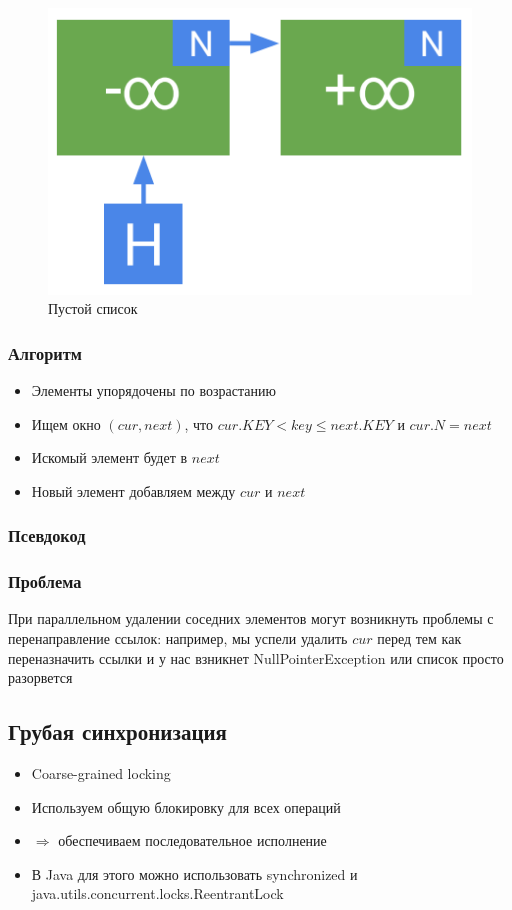 \documentclass[10pt,a4paper,oneside,titlepage]{article}
\theoremstyle{plain}
\theoremstyle{defenition}
\begin{document}
\begin{figure}
	\centering
	\includegraphics[width=0.4\linewidth]{pictures/Set2}
	\caption{Пустой список}
	\label{fig:set2}
\end{figure}

\subsubsection{Алгоритм}

\begin{itemize}
	\item Элементы упорядочены по возрастанию
	\item Ищем окно $(cur, next)$, что $cur.KEY<key\leqslant next.KEY$ и $cur.N=next$
	\item Искомый элемент будет в $next$
	\item Новый элемент добавляем между $cur$ и $next$
\end{itemize}

\subsubsection{Псевдокод}



\subsubsection{Проблема}

При параллельном удалении соседних элементов могут возникнуть проблемы с перенаправление ссылок: например, мы успели удалить $cur$ перед тем как переназначить ссылки и у нас взникнет NullPointerException или список просто разорвется

\subsection{Грубая синхронизация}

\begin{itemize}
	\item Coarse-grained locking
	\item Используем общую блокировку для всех операций
	\item $\Rightarrow$ обеспечиваем последовательное исполнение
	\item В Java для этого можно использовать synchronized и java.utils.concurrent.locks.ReentrantLock
\end{itemize}
\end{document}
